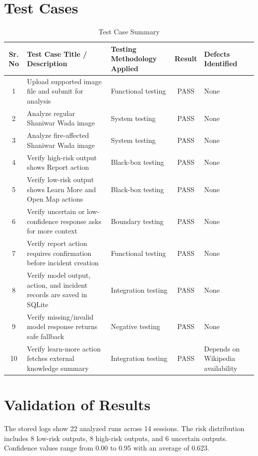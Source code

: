 \section{Test Cases}
\begin{table}[H]
\centering
\caption{Test Case Summary}
\renewcommand{\arraystretch}{1.3}
\small
\begin{tabularx}{\textwidth}{|c|X|X|c|X|}
\hline
\textbf{Sr. No} & \textbf{Test Case Title / Description} & \textbf{Testing Methodology Applied} & \textbf{Result} & \textbf{Defects Identified} \\
\hline
1 & Upload supported image file and submit for analysis & Functional testing & PASS & None \\
\hline
2 & Analyze regular Shaniwar Wada image & System testing & PASS & None \\
\hline
3 & Analyze fire-affected Shaniwar Wada image & System testing & PASS & None \\
\hline
4 & Verify high-risk output shows Report action & Black-box testing & PASS & None \\
\hline
5 & Verify low-risk output shows Learn More and Open Map actions & Black-box testing & PASS & None \\
\hline
6 & Verify uncertain or low-confidence response asks for more context & Boundary testing & PASS & None \\
\hline
7 & Verify report action requires confirmation before incident creation & Functional testing & PASS & None \\
\hline
8 & Verify model output, action, and incident records are saved in SQLite & Integration testing & PASS & None \\
\hline
9 & Verify missing/invalid model response returns safe fallback & Negative testing & PASS & None \\
\hline
10 & Verify learn-more action fetches external knowledge summary & Integration testing & PASS & Depends on Wikipedia availability \\
\hline
\end{tabularx}
\end{table}

\section{Validation of Results}
The stored logs show 22 analyzed runs across 14 sessions. The risk distribution includes 8 low-risk outputs, 8 high-risk outputs, and 6 uncertain outputs. Confidence values range from 0.00 to 0.95 with an average of 0.623.

